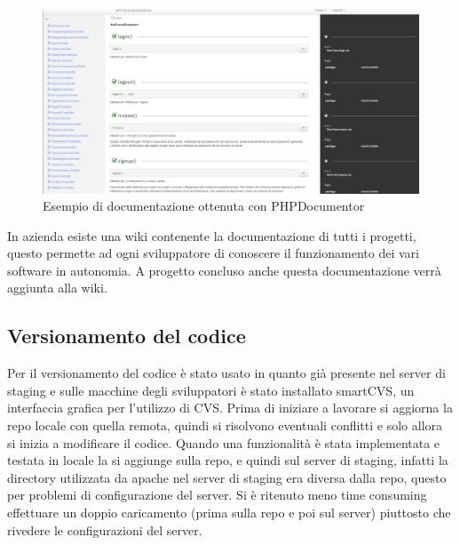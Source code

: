 \begin{figure}[H]
\centering
\includegraphics[width=1.2\textwidth]{images/phpdocumentor.png}
\caption{Esempio di documentazione ottenuta con PHPDocumentor}
\end{figure}

In azienda esiste una wiki contenente la documentazione di tutti i progetti, questo permette ad ogni sviluppatore di conoscere il funzionamento dei vari software in autonomia. A progetto concluso anche questa documentazione verrà aggiunta alla wiki.

\subsection{Versionamento del codice}
Per il versionamento del codice è stato usato  in quanto già presente nel server di staging e sulle macchine degli sviluppatori è stato installato smartCVS, un interfaccia grafica per l'utilizzo di CVS.
Prima di iniziare a lavorare si aggiorna la repo locale con quella remota, quindi si risolvono eventuali conflitti e solo allora si inizia a modificare il codice. Quando una funzionalità è stata implementata e testata in locale la si aggiunge sulla repo, e quindi sul server di staging, infatti la directory utilizzata da apache nel server di staging era diversa dalla repo, questo per problemi di configurazione del server. Si è ritenuto meno time consuming %
effettuare un doppio caricamento (prima sulla repo e poi sul server) piuttosto che rivedere le configurazioni del server.